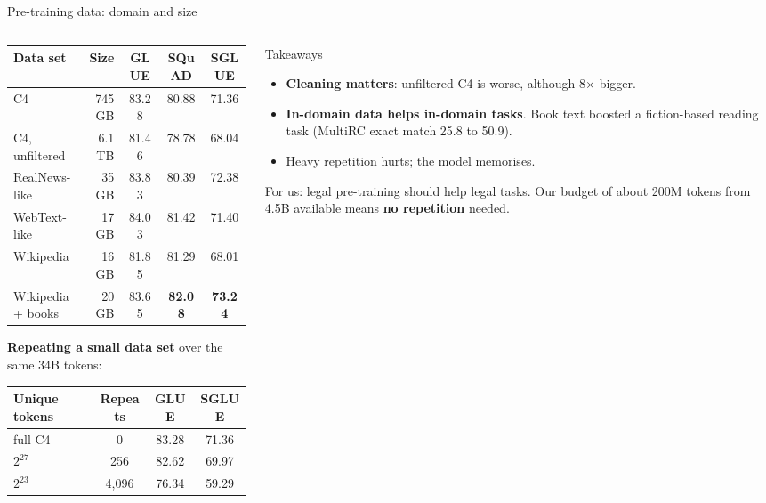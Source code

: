 \documentclass[aspectratio=169,11pt]{beamer}
\begin{document}
\begin{frame}{Pre-training data: domain and size}
  \begin{columns}[T]
    \begin{column}{0.52\textwidth}
      \scriptsize
      \begin{tabular}{@{}lrccc@{}}
        \toprule
        Data set & Size & GLUE & SQuAD & SGLUE\\
        \midrule
        C4 & 745 GB & 83.28 & 80.88 & 71.36\\
        C4, unfiltered & 6.1 TB & 81.46 & 78.78 & 68.04\\
        RealNews-like & 35 GB & 83.83 & 80.39 & 72.38\\
        WebText-like & 17 GB & 84.03 & 81.42 & 71.40\\
        Wikipedia & 16 GB & 81.85 & 81.29 & 68.01\\
        Wikipedia + books & 20 GB & 83.65 & \textbf{82.08} & \textbf{73.24}\\
        \bottomrule
      \end{tabular}
      \vspace{1mm}

      \textbf{Repeating a small data set} over the same 34B tokens:
      \vspace{1mm}

      \begin{tabular}{@{}lccc@{}}
        \toprule
        Unique tokens & Repeats & GLUE & SGLUE\\
        \midrule
        full C4 & 0 & 83.28 & 71.36\\
        $2^{27}$ & 256 & 82.62 & 69.97\\
        $2^{23}$ & 4,096 & 76.34 & 59.29\\
        \bottomrule
      \end{tabular}
    \end{column}
    \begin{column}{0.44\textwidth}
      \begin{exampleblock}{Takeaways}
        \small
        \begin{itemize}
          \item \textbf{Cleaning matters}: unfiltered C4 is worse, although 8$\times$ bigger.
          \item \textbf{In-domain data helps in-domain tasks}. Book text boosted a fiction-based reading task (MultiRC exact match 25.8 to 50.9).
          \item Heavy repetition hurts; the model memorises.
        \end{itemize}
        For us: legal pre-training should help legal tasks. Our budget of about 200M tokens from 4.5B available means \textbf{no repetition} needed.
      \end{exampleblock}
    \end{column}
  \end{columns}
\end{frame}
\end{document}
